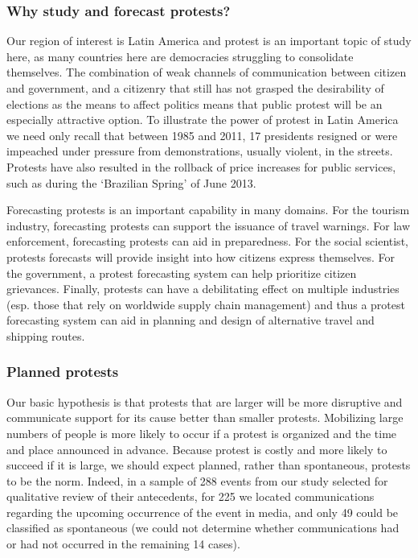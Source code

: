 \documentclass[letterpaper]{article}
\begin{document}
\subsubsection{Why study and forecast protests?}
Our region of interest is Latin America and protest
is an important topic of study here,
as many countries here are democracies struggling to consolidate themselves. The combination of weak channels of communication 
between citizen and government, and a citizenry that still has not grasped the desirability of elections as the means to affect politics 
means that public protest will be an especially attractive option. To 
illustrate the power of protest in Latin America we need only recall 
that between 1985 and 2011, 17 presidents resigned or were impeached under pressure from demonstrations, usually violent, in the streets. Protests have 
also resulted in the rollback of price increases for public services, such as during the ‘Brazilian Spring’ of June 2013.

Forecasting protests is an important capability in many domains.
For the tourism industry, forecasting protests can
support the issuance of travel warnings. For law enforcement,
forecasting protests can aid in preparedness. For the social scientist,
protests forecasts will provide insight into how citizens express themselves.
For the government, a protest forecasting system can help prioritize
citizen grievances. Finally, protests can have a debilitating effect on
multiple industries (esp. those that rely on worldwide supply chain management)
and thus a protest forecasting system can aid in planning and design
of alternative travel and shipping routes.

\vspace{-0.5em}
\subsubsection{Planned protests}
Our basic hypothesis is that
protests that are larger will be more disruptive and communicate support for its cause better than smaller protests. 
Mobilizing large numbers of people is more likely to occur if a protest is organized and the time and place announced in
advance. Because protest is costly and more likely to succeed if it is large, we should expect planned, rather than 
spontaneous, protests to be the norm. Indeed, in a sample of 288 events from our study selected for qualitative review of their antecedents,
for 225 we located communications regarding the upcoming occurrence of the event in media, and only 49 could be classified as 
spontaneous (we could not determine whether communications had or had not occurred in the remaining 14 cases).
\end{document}
